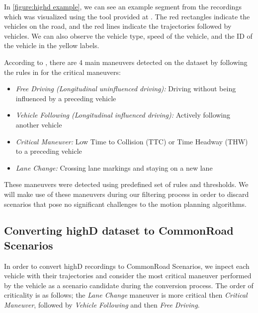 \documentclass[conference]{IEEEtran}
\begin{document}
In \autoref{figure:highd example}, we can see an example segment from the recordings which was visualized using the tool provided at \cite{highdtools}. The red rectangles indicate the vehicles on the road, and the red lines indicate the trajectories followed by vehicles. We can also observe the vehicle type, speed of the vehicle, and the ID of the vehicle in the yellow labels.

According to \cite{highDdataset}, there are 4 main maneuvers detected on the dataset by following the rules in \cite{benmimoun2011incident} for the critical maneuvers:
\begin{itemize}
	\item \textit{Free Driving (Longitudinal uninfluenced driving):} Driving without being influenced by a preceding vehicle
	\item \textit{Vehicle Following (Longitudinal influenced driving):} Actively following another vehicle
	\item \textit{Critical Maneuver:} Low Time to Collision (TTC) or Time
Headway (THW) to a preceding vehicle
	\item \textit{Lane Change:} Crossing lane markings and staying on a
new lane 
\end{itemize}

These maneuvers were detected using predefined set of rules and thresholds. We will make use of these maneuvers during our filtering process in order to discard scenarios that pose no significant challenges to the motion planning algorithms.

\subsection{Converting highD dataset to CommonRoad Scenarios}
\label{subsection:converting highd to commonroad}
In order to convert highD recordings to CommonRoad Scenarios, we inpect each vehicle with their trajectories and consider the most critical maneuver performed by the vehicle as a scenario candidate during the conversion process. The order of criticality is as follows; the \textit{Lane Change} maneuver is more critical then \textit{Critical Maneuver}, followed by \textit{Vehicle Following} and then \textit{Free Driving}. 
\end{document}
